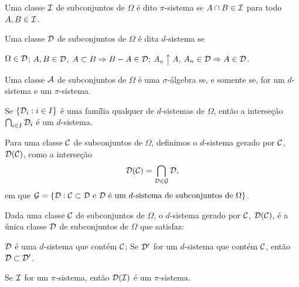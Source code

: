\begin{definition}[$\pi$-sistema]
	Uma classe $\mathcal{I}$ de subconjuntos de $\Omega$ é dito $\pi$-sistema se $A \cap B \in \mathcal{I}$ para todo $A, B \in \mathcal{I}$.
\end{definition}

\begin{definition}[$d$-sistema]
	Uma classe $\mathcal{D}$ de subconjuntos de $\Omega$ é dita $d$-sistema se
	\begin{outline}[enumerate]
		\1 $\Omega \in \mathcal{D}$;
		\1 $A, B \in \mathcal{D}$, $A \subset B \Rightarrow B - A \in \mathcal{D}$;
		\1 $A_n \uparrow A$, $A_n \in \mathcal{D} \Rightarrow A \in \mathcal{D}$.
	\end{outline}
\end{definition}

\begin{theorem}
	Uma classe $\mathcal{A}$ de subconjuntos de $\Omega$ é uma $\sigma$-álgebra se, e somente se, for um $d$-sistema e um $\pi$-sistema.
\end{theorem}

\begin{theorem}
	Se $\{\mathcal{D}_i : i \in I\}$ é uma família qualquer de $d$-sistemas de $\Omega$, então a interseção $\bigcap_{i \in I} \mathcal{D}_i$ é um $d$-sistema.
\end{theorem}

\begin{definition}
	Para uma classe $\mathcal{C}$ de subconjuntos de $\Omega$, definimos o $d$-sistema gerado por $\mathcal{C}$, $\mathcal{D}(\mathcal{C})$, como a interseção
	\[
	\mathcal{D}(\mathcal{C}) = \bigcap_{\mathcal{D} \in \mathcal{G}} \mathcal{D},
	\]
	em que $\mathcal{G} = \{\mathcal{D} : \mathcal{C} \subset \mathcal{D} \text{ e } \mathcal{D} \text{ é um } d\text{-sistema de subconjuntos de } \Omega\}$.
\end{definition}

\begin{theorem}
	Dada uma classe $\mathcal{C}$ de subconjuntos de $\Omega$, o $d$-sistema gerado por $\mathcal{C}$, $\mathcal{D}(\mathcal{C})$, é a única classe $\mathcal{D}$ de subconjuntos de $\Omega$ que satisfaz:
	\begin{outline}[enumerate]
		\1 $\mathcal{D}$ é uma $d$-sistema que contém $\mathcal{C}$;
		\1 Se $\mathcal{D}'$ for um $d$-sistema que contém $\mathcal{C}$, então $\mathcal{D} \subset \mathcal{D}'$.
	\end{outline}
\end{theorem}

\begin{theorem}
	Se $\mathcal{I}$ for um $\pi$-sistema, então $\mathcal{D}(\mathcal{I})$ é um $\pi$-sistema.
\end{theorem}

